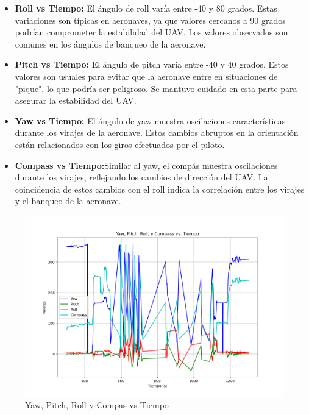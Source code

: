         \begin{itemize}
            \item \textbf{Roll vs Tiempo:} El ángulo de roll varía entre -40 y 80 grados. Estas variaciones son típicas en aeronaves, ya que valores cercanos a 90 grados podrían comprometer la estabilidad del UAV. Los valores observados son comunes en los ángulos de banqueo de la aeronave.\\

            \item \textbf{Pitch vs Tiempo:} El ángulo de pitch varía entre -40 y 40 grados. Estos valores son usuales para evitar que la aeronave entre en situaciones de "pique", lo que podría ser peligroso. Se mantuvo cuidado en esta parte para asegurar la estabilidad del UAV.\\

        \item \textbf{Yaw vs Tiempo: }El ángulo de yaw muestra oscilaciones características durante los virajes de la aeronave. Estos cambios abruptos en la orientación están relacionados con los giros efectuados por el piloto.\\

        \item \textbf{Compass vs Tiempo:}Similar al yaw, el compás muestra oscilaciones durante los virajes, reflejando los cambios de dirección del UAV. La coincidencia de estos cambios con el roll indica la correlación entre los virajes y el banqueo de la aeronave.
        \end{itemize}


        \begin{figure}[H]
            \centering
            \includegraphics[width=13 cm]{Imagenes/Vuelo/yaw_pitch_roll_vs_tiempo.png}
            \caption{Yaw, Pitch, Roll y Compas vs Tiempo}
            \label{fig:datosYawPitch, roll}
        \end{figure}


